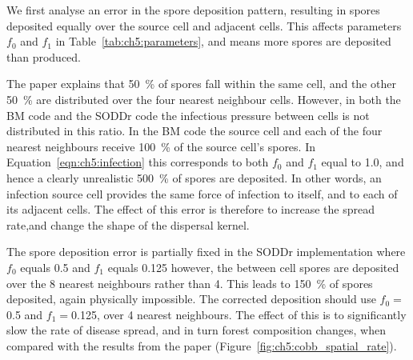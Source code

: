 We first analyse an error in the spore deposition pattern, resulting in spores deposited equally over the source cell and adjacent cells. This affects parameters $f_0$ and $f_1$ in Table~\ref{tab:ch5:parameters}, and means more spores are deposited than produced.

The paper explains that \SI{50}{\percent} of spores fall within the same cell, and the other \SI{50}{\percent} are distributed over the four nearest neighbour cells. However, in both the BM code and the SODDr code the infectious pressure between cells is not distributed in this ratio. In the BM code the source cell and each of the four nearest neighbours receive \SI{100}{\percent} of the source cell's spores. In Equation~\ref{eqn:ch5:infection} this corresponds to both $f_0$ and $f_1$ equal to \num{1.0}, and hence a clearly unrealistic \SI{500}{\percent} of spores are deposited. In other words, an infection source cell provides the same force of infection to itself, and to each of its adjacent cells. The effect of this error is therefore to increase the spread rate,and change the shape of the dispersal kernel.

The spore deposition error is partially fixed in the SODDr implementation where $f_0$ equals 0.5 and $f_1$ equals \num{0.125} however, the between cell spores are deposited over the 8 nearest neighbours rather than 4. This leads to \SI{150}{\percent} of spores deposited, again physically impossible. The corrected deposition should use $f_0=$\num{0.5} and $f_1=$\num{0.125}, over 4 nearest neighbours. The effect of this is to significantly slow the rate of disease spread, and in turn forest composition changes, when compared with the results from the paper (Figure~\ref{fig:ch5:cobb_spatial_rate}).

